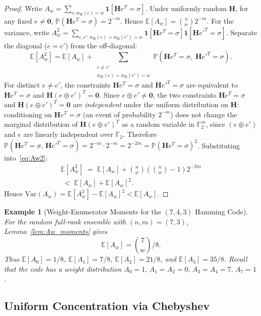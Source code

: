 \documentclass[journal,10pt,onecolumn]{IEEEtran}
\newtheorem{example}{Example}
\newcommand{\Fb}{\mathbb{F}}
\newcommand{\Eb}{\mathbb{E}}
\newcommand{\Pb}{\mathbb{P}}
\newcommand{\wH}{w_{\mathrm{H}}}
\newcommand{\Hm}{\mathbf{H}}
\begin{document}
\begin{proof}
Write $A_w=\sum_{e:\wH(e)=w}\mathbf{1}[\Hm e^T=\sigma]$.
Under uniformly random $\Hm$, for any fixed $e\ne\bm{0}$,
$\Pb(\Hm e^T=\sigma)=2^{-m}$.
Hence $\Eb[A_w]=\binom{n}{w}2^{-m}$.
For the variance, write
$A_w^2 = \sum_{e,e' :\wH(e)=\wH(e')=w}
\mathbf{1}[\Hm e^T=\sigma]\mathbf{1}[\Hm e'^T=\sigma]$.
Separate the diagonal ($e=e'$) from the off-diagonal:
\begin{equation}
    \Eb[A_w^2]
    =
    \Eb[A_w]
    + \sum_{\substack{e\ne e'\\\wH(e)=\wH(e')=w}}\!\!\!
    \Pb(\Hm e^T=\sigma,\;\Hm e'^T=\sigma).
    \label{eq:Aw2}
\end{equation}
For distinct $e\ne e'$, the constraints $\Hm e^T=\sigma$ and
$\Hm e'^T=\sigma$ are equivalent to $\Hm e^T=\sigma$ and
$\Hm (e\oplus e')^T=\bm{0}$.
Since $e\oplus e'\ne\bm{0}$, the two constraints
$\Hm e^T=\sigma$ and $\Hm (e\oplus e')^T=\bm{0}$ are \emph{independent}
under the uniform distribution on $\Hm$:
conditioning on $\Hm e^T=\sigma$ (an event of probability $2^{-m}$)
does not change the marginal distribution of $\Hm (e\oplus e')^T$
as a random variable in $\Fb_2^m$, since $(e\oplus e')$ and $e$
are linearly independent over $\Fb_2$.
Therefore
$\Pb(\Hm e^T=\sigma,\,\Hm e'^T=\sigma)=2^{-m}\cdot 2^{-m}=2^{-2m}
=\Pb(\Hm e^T=\sigma)^2$.
Substituting into~\eqref{eq:Aw2}:
\begin{align*}
    \Eb[A_w^2]
    \;=\;
    \Eb[A_w]
    + \binom{n}{w}\!\left(\binom{n}{w}-1\right)2^{-2m} \\
    \;<\;
    \Eb[A_w]+\Eb[A_w]^2.
\end{align*}
Hence $\mathrm{Var}(A_w)=\Eb[A_w^2]-\Eb[A_w]^2<\Eb[A_w]$.
\end{proof}

\begin{example}[Weight-Enumerator Moments for the $(7,4,3)$ Hamming Code]
\label{ex:hamming_moments}
For the \emph{random full-rank ensemble} with $(n,m)=(7,3)$,
Lemma~\ref{lem:Aw_moments} gives
\[
\Eb[A_w]=\binom{7}{w}/8.
\]
Thus $\Eb[A_0]=1/8$, $\Eb[A_1]=7/8$, $\Eb[A_2]=21/8$, and
$\Eb[A_3]=35/8$.
Recall that the code has a weight distribution
$A_0=1,\, A_1=A_2=0,\, A_3=A_4=7,\, A_7=1$.
\end{example}

\subsection{Uniform Concentration via Chebyshev}
\end{document}
